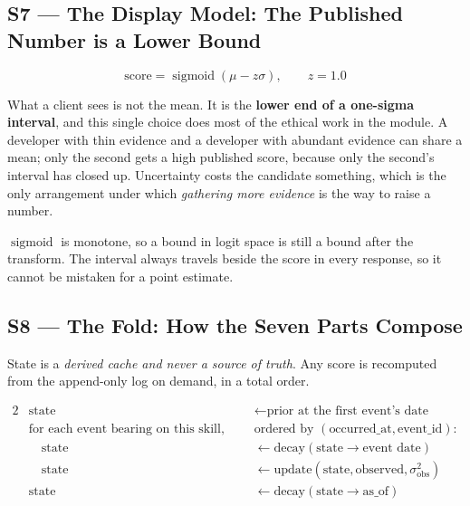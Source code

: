 \documentclass[11pt,a4paper]{article}
\DeclareMathOperator{\sig}{sigmoid}
\newenvironment{keyeq}{%
  \begin{shaded}
  \centering
}{%
  \end{shaded}
}
\begin{document}
\subsection{S7 --- The Display Model: The Published Number is a Lower Bound}

\begin{keyeq}
\[
\text{score} = \sig(\mu - z\sigma), \qquad z = 1.0
\]
\end{keyeq}

What a client sees is not the mean. It is the \textbf{lower end of a
one-sigma interval}, and this single choice does most of the ethical work in
the module. A developer with thin evidence and a developer with abundant
evidence can share a mean; only the second gets a high published score,
because only the second's interval has closed up. Uncertainty costs the
candidate something, which is the only arrangement under which
\emph{gathering more evidence} is the way to raise a number.

$\sig$ is monotone, so a bound in logit space is still a bound after the
transform. The interval always travels beside the score in every response,
so it cannot be mistaken for a point estimate.

\subsection{S8 --- The Fold: How the Seven Parts Compose}

State is a \emph{derived cache and never a source of truth}. Any score is
recomputed from the append-only log on demand, in a total order.

\begin{keyeq}
\begin{alignat*}{2}
&\text{state} &&\gets \text{prior at the first event's date}\\
&\text{for each event bearing on this skill,}\quad&&\text{ordered by } (\text{occurred\_at}, \text{event\_id}):\\
&\quad\text{state} &&\gets \text{decay}(\text{state} \to \text{event date})\\
&\quad\text{state} &&\gets \text{update}(\text{state}, \text{observed}, \sigma^2_{\text{obs}})\\
&\text{state} &&\gets \text{decay}(\text{state} \to \text{as\_of})
\end{alignat*}
\end{keyeq}
\end{document}
